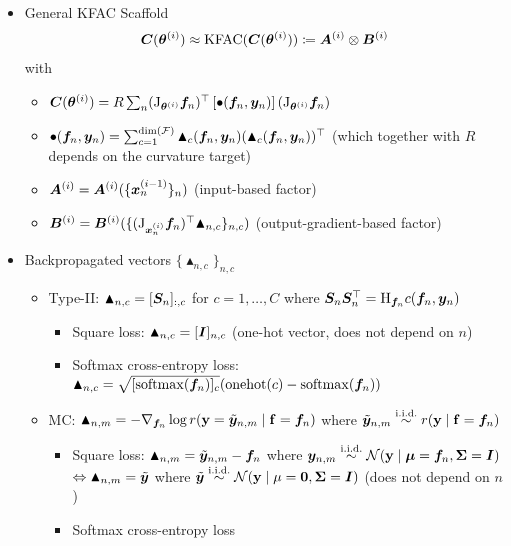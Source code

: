 \begin{itemize}
  \item General KFAC Scaffold
  \begin{align*}
    {\bm{C}}({\bm{\theta}}^{(i)})
    \approx
    \mathrm{KFAC}({\bm{C}}({\bm{\theta}}^{(i)}))
    \coloneqq {\bm{A}}^{(i)} \otimes {\bm{B}}^{(i)}
  \end{align*}
  with
  \begin{itemize} 
    \item ${\bm{C}}({\bm{\theta}}^{(i)})
    = R \sum_n
    (\mathrm{J}_{{\bm{\theta}}^{(i)}} {\bm{f}}_n)^{\top}
    \left[ \bullet({\bm{f}}_n, {\bm{y}}_n) \right]
    (\mathrm{J}_{{\bm{\theta}}^{(i)}} {\bm{f}}_n)$
    \item $\bullet({\bm{f}}_n, {\bm{y}}_n) = \sum_{c=1}^{\dim({\mathcal{F}})} \blacktriangle_c({\bm{f}}_n, {\bm{y}}_n) (\blacktriangle_c({\bm{f}}_n, {\bm{y}}_n))^{\top}$ \quad (which together with $R$ depends on the curvature target)
    \item ${\bm{A}}^{(i)} = {\bm{A}}^{(i)}( \{{\bm{x}}_{n}^{(i-1)}\}_n )$ \quad (input-based factor)
    \item ${\bm{B}}^{(i)} = {\bm{B}}^{(i)}( \{ (\mathrm{J}_{{\bm{x}}_n^{(i)}}{\bm{f}}_{n})^{\top} \blacktriangle_{n,c}\}_{n,c})$ \quad (output-gradient-based factor)
  \end{itemize}
  \item Backpropagated vectors $\{ \blacktriangle_{n,c} \}_{n,c}$
    \begin{itemize}
    \item Type-II: $\blacktriangle_{n,c} = [{\bm{S}}_n]_{:,c}$ for $c = 1, \dots, C$ where ${\bm{S}}_n {\bm{S}}_n^{\top} = \mathrm{H}_{{\bm{f}}_n} c({\bm{f}}_n, {\bm{y}}_n)$
      \begin{itemize}
      \item Square loss: $\blacktriangle_{n,c} = [{\bm{I}}]_{n,c}$  (one-hot vector, does not depend on $n$)
      \item Softmax cross-entropy loss: $\blacktriangle_{n,c} =  \sqrt{[\mathrm{softmax}({\bm{f}}_n)]_c} (\mathrm{onehot}(c) - \mathrm{softmax}({\bm{f}}_n))$
      \end{itemize}

    \item MC: $\blacktriangle_{n,m} = - \nabla_{{\bm{f}}_n} \log r({\mathbf{y}} = \tilde{{\bm{y}}}_{n,m} \mid {\mathbf{f}} = {\bm{f}}_n)$ where $\tilde{{\bm{y}}}_{n,m} \stackrel{\text{i.i.d.}}{\sim} r({\mathbf{y}} \mid {\mathbf{f}} = {\bm{f}}_n)$
      \begin{itemize}
      \item Square loss: $\blacktriangle_{n,m} = \tilde{{\bm{y}}}_{n,m} - {\bm{f}}_n$ where ${\bm{y}}_{n,m} \stackrel{\text{i.i.d.}}{\sim} {\mathcal{N}}({\mathbf{y}} \mid {\bm{\mu}} = {\bm{f}}_n, {\bm{\Sigma}} = {\bm{I}})$\\
        $\Leftrightarrow \blacktriangle_{n,m} = \tilde{{\bm{y}}}$ where $\tilde{{\bm{y}}} \stackrel{\text{i.i.d.}}{\sim} {\mathcal{N}}({\mathbf{y}} \mid \mu = {\bm{0}}, {\bm{\Sigma}} = {\bm{I}})$ (does not depend on $n$)
        \item Softmax cross-entropy loss
      \end{itemize}


\end{itemize}
\end{itemize}
